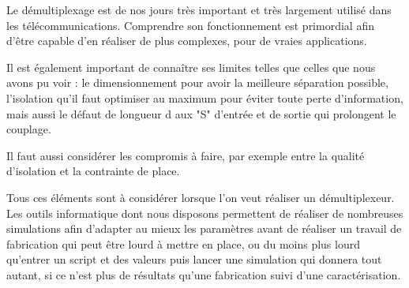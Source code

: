 \documentclass[a4paper,11pt]{report}
\begin{document}
Le démultiplexage est de nos jours très important et très largement utilisé dans les télécommunications. Comprendre son fonctionnement est primordial afin d'être capable d'en réaliser de plus complexes, pour de vraies applications.

Il est également important de connaître ses limites telles que celles que nous avons pu voir : le dimensionnement pour avoir la meilleure séparation possible, l'isolation qu'il faut optimiser au maximum pour éviter toute perte d'information, mais aussi le défaut de longueur d aux "S" d'entrée et de sortie qui prolongent le couplage.

Il faut aussi considérer les compromis à faire, par exemple entre la qualité d'isolation et la contrainte de place.

Tous ces éléments sont à considérer lorsque l'on veut réaliser un démultiplexeur. Les outils informatique dont nous disposons permettent de réaliser de nombreuses simulations afin d'adapter au mieux les paramètres avant de réaliser un travail de fabrication qui peut être lourd à mettre en place, ou du moins plus lourd qu'entrer un script et des valeurs puis lancer une simulation qui donnera tout autant, si ce n'est plus de résultats qu'une fabrication suivi d'une caractérisation. 

\nocite{*}


\end{document}
